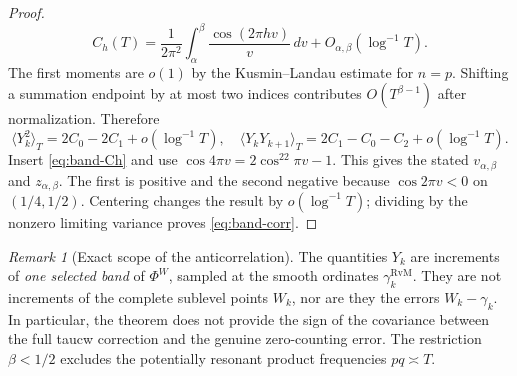 \documentclass[11pt,leqno]{amsart}
\numberwithin{equation}{section}
\theoremstyle{definition}
\theoremstyle{remark}
\newtheorem{remark}[theorem]{Remark}
\newcommand{\1}{\mathbf 1}
\begin{document}
\begin{proof}
\begin{equation}
 C_h(T)=\frac1{2\pi^2}\int_\alpha^\beta\frac{\cos(2\pi hv)}v\,dv+O_{\alpha,\beta}(\log^{-1}T).
\end{equation}
The first moments are $o(1)$ by the Kusmin--Landau estimate for $n=p$. Shifting a summation endpoint by at most two indices contributes $O(T^{\beta-1})$ after normalization. Therefore
\[
 \langle Y_k^2\rangle_T=2C_0-2C_1+o(\log^{-1}T),\quad
 \langle Y_kY_{k+1}\rangle_T=2C_1-C_0-C_2+o(\log^{-1}T).
\]
Insert \eqref{eq:band-Ch} and use $\cos4\pi v=2\cos^22\pi v-1$. This gives the stated $v_{\alpha,\beta}$ and $z_{\alpha,\beta}$. The first is positive and the second negative because $\cos2\pi v<0$ on $(1/4,1/2)$. Centering changes the result by $o(\log^{-1}T)$; dividing by the nonzero limiting variance proves \eqref{eq:band-corr}.
\end{proof}
\begin{remark}[Exact scope of the anticorrelation]\label{rem:band-scope}
The quantities $Y_k$ are increments of \emph{one selected band} of $\Phi^W$, sampled at the smooth ordinates $\gamma_k^{\mathrm{RvM}}$. They are not increments of the complete sublevel points $W_k$, nor are they the errors $W_k-\gamma_k$. In particular, the theorem does not provide the sign of the covariance between the full taucw correction and the genuine zero-counting error. The restriction $\beta<1/2$ excludes the potentially resonant product frequencies $pq\asymp T$.
\end{remark}
\end{document}
